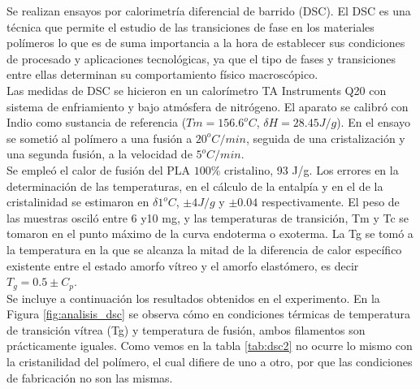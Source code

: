 Se realizan ensayos por calorimetría diferencial de barrido (DSC). El DSC es una técnica que permite el estudio de las transiciones de fase en los materiales polímeros\cite{DSC1} lo que es de suma importancia a la hora de establecer sus condiciones de procesado y aplicaciones tecnológicas, ya que el tipo de fases y transiciones entre ellas determinan su comportamiento físico macroscópico.\\

Las medidas de DSC se hicieron en un calorímetro TA Instruments Q20 con sistema de enfriamiento y bajo atmósfera de nitrógeno. El aparato se calibró con Indio como sustancia de referencia ($Tm = 156.6 ^o C$, $\delta H = 28.45 J/g$). En el ensayo se sometió al polímero a una fusión a $20 ^o C/min$, seguida de una cristalización y una segunda fusión, a la velocidad de $5 ^o C/min$.\\

Se empleó el calor de fusión del PLA $100\%$ cristalino, 93 J/g. Los errores en la determinación de las temperaturas, en el cálculo de la entalpía y en el de la cristalinidad se estimaron en $\delta1 ^o C$, $\pm4 J/g$ y $\pm0.04$ respectivamente. El peso de las muestras osciló entre 6 y10 mg, y las temperaturas de transición, Tm y Tc se tomaron en el punto máximo de la curva endoterma o exoterma. La Tg se tomó a la temperatura en la que se alcanza la mitad de la diferencia de calor específico existente entre el estado amorfo vítreo y el amorfo elastómero, es decir $T_{g} = 0.5 \pm C_{p}$.\\

Se incluye a continuación los resultados obtenidos en el experimento. En la Figura \ref{fig:analisis_dsc} se observa cómo en condiciones térmicas de temperatura de transición vítrea (Tg) y temperatura de fusión, ambos filamentos son prácticamente iguales. Como vemos en la tabla \ref{tab:dsc2} no ocurre lo mismo con la cristanilidad del polímero, el cual difiere de uno a otro, por que las condiciones de fabricación no son las mismas.\\

